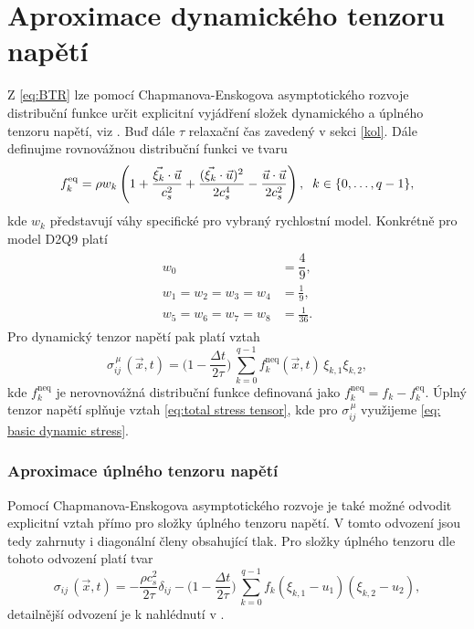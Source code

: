 \section*{\fontsize{11}{15}\selectfont Aproximace dynamického tenzoru napětí}
Z \eqref{eq:BTR} lze pomocí Chapmanova-Enskogova asymptotického rozvoje distribuční funkce určit explicitní vyjádření složek dynamického a úplného tenzoru napětí, viz \cite{Guo}. Buď dále $ \tau $ relaxační čas zavedený v sekci \ref{kol}. Dále definujme rovnovážnou distribuční funkci ve tvaru
\begin{equation}\label{eq:feq}
f^{\mathrm{eq}}_{k} = \rho w_{k} \, \Bigg(1 + \frac{\vec{\xi_{k}} \cdot \vec{u}}{c^{2}_{s}} + \frac{(\vec{\xi_{k}} \cdot \vec{u})^2}{2c^{4}_{s}} - \frac{\vec{u} \cdot \vec{u}}{2c^{2}_{s}} \Bigg)\, , \hspace{2mm} k \in \{0,\dots,q-1\},
\end{equation}
kde $ w_{k} $ představují váhy specifické pro vybraný rychlostní model. Konkrétně pro model D2Q9 platí
\begin{align}\label{weighs}
\begin{split}
w_{0} &  = \dfrac{4}{9},\\[4pt]
w_{1} = w_{2} = w_{3} = w_{4} & = \frac{1}{9},\\[4pt]
w_{5} = w_{6} = w_{7} = w_{8} & = \frac{1}{36}.
\end{split}
\end{align}
Pro dynamický tenzor napětí pak platí vztah
\begin{equation}\label{eq: basic dynamic stress}
\sigma^{\, \mu}_{ij} \, (\vec{x}, t) = \Bigg(1 - \frac{\Delta t}{2 \tau}\Bigg) \, \sum_{k=0}^{q-1}f^{\mathrm{neq}}_{k} (\vec{x}, t) \, {\xi}_{k,1} {\xi}_{k,2},
\end{equation}
kde $ f^{\mathrm{neq}}_{k} $ je nerovnovážná distribuční funkce definovaná jako $ f^{\mathrm{neq}}_{k} = f^{}_{k} - f^{\mathrm{eq}}_{k}$. Úplný tenzor napětí splňuje vztah \eqref{eq:total stress tensor}, kde pro $ \sigma^{\, \mu}_{ij} $ využijeme \eqref{eq: basic dynamic stress}.

\subsubsection*{\fontsize{11}{15}\selectfont Aproximace úplného tenzoru napětí}
Pomocí Chapmanova-Enskogova asymptotického rozvoje je také možné odvodit explicitní vztah přímo pro složky úplného tenzoru napětí. V tomto odvození jsou tedy zahrnuty i diagonální členy obsahující tlak. Pro složky úplného tenzoru dle tohoto odvození platí tvar
\begin{equation}\label{eq:inamuro}
\sigma_{ij} \, (\vec{x}, t) = - \frac{\rho c^{2}_{s}}{2 \tau} \delta_{ij} - \Bigg(1 - \frac{\Delta t}{2 \tau}\Bigg) \, \sum_{k=0}^{q-1}f_{k} ({\xi}_{k,1} - {u}_{1})({\xi}_{k,2} - {u}_{2}),
\end{equation}
detailnější odvození je k nahlédnutí v \cite{Inamuro1997}.
